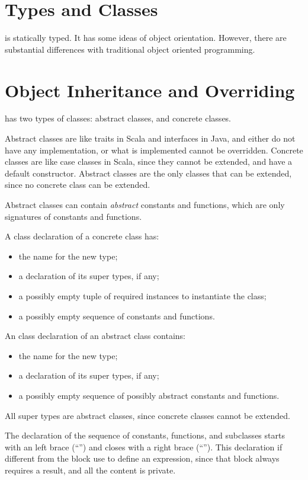 \section{Types and Classes}

\Soda is statically typed.
It has some ideas of object orientation.
However, there are substantial differences with traditional object oriented programming.


\section{Object Inheritance and Overriding}

\Soda has two types of classes: abstract classes, and concrete classes.

Abstract classes are like traits in Scala and interfaces in Java, and either do not have any implementation, or what is implemented cannot be overridden.
Concrete classes are like case classes in Scala, since they cannot be extended, and have a default constructor.
Abstract classes are the only classes that can be extended, since no concrete class can be extended.

Abstract classes can contain \textit{abstract} constants and functions, which are only signatures of constants and functions.

A class declaration of a concrete class has:
\begin{itemize}
    \item the name for the new type;
    \item a declaration of its super types, if any;
    \item a possibly empty tuple of required instances to instantiate the class;
    \item a possibly empty sequence of constants and functions.
\end{itemize}


An class declaration of an abstract class contains:
\begin{itemize}
    \item the name for the new type;
    \item a declaration of its super types, if any;
    \item a possibly empty sequence of possibly abstract constants and functions.
\end{itemize}

All super types are abstract classes, since concrete classes cannot be extended.

The declaration of the sequence of constants, functions, and subclasses starts with an left brace (``\srccode{\{}'') and closes with a right brace (``\srccode{\}}'').
This declaration if different from the block use to define an expression, since that block always requires a result, and all the content is private.

